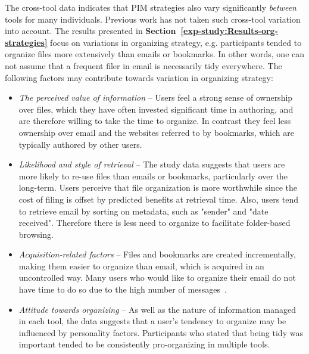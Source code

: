 The cross-tool data indicates that PIM strategies also vary significantly \textit{between} tools for many individuals. Previous work has not taken such cross-tool variation into account.  The results presented in \textbf{Section~\ref{exp-study:Results-org-strategies}} focus on variations in organizing strategy, e.g. participants tended to organize files more extensively than emails or bookmarks.  In other words, one can not assume that a frequent filer in email is necessarily tidy everywhere.
The following factors may contribute towards variation in organizing strategy:
\begin{itemize}
\item \textit{The perceived value of information} -- Users feel a strong sense of ownership over files, which they have often invested significant time in authoring, and are therefore willing to take the time to organize. In contrast they feel less ownership over email and the websites referred to by bookmarks, which are typically authored by other users.

\item \textit{Likelihood and style of retrieval} -- The study data suggests that users are more likely to re-use files than emails or bookmarks, particularly over the long-term. Users perceive that file organization is more worthwhile since the cost of filing is offset by predicted benefits at retrieval time. Also, users tend to retrieve email by sorting on metadata, such as "sender" and "date received". Therefore there is less need to organize to facilitate folder-based browsing.

\item \textit{Acquisition-related factors} -- Files and bookmarks are created incrementally, making them easier to organize than email, which is acquired in an uncontrolled way. Many users who would like to organize their email do not have time to do so due to the high number of messages~\citep{Whittaker-email:96}.

\item \textit{Attitude towards organizing} -- As well as the nature of information managed in each tool, the data suggests that a user's tendency to organize may be influenced by personality factors. Participants who stated that being tidy was important tended to be consistently pro-organizing in multiple tools.


\end{itemize}

